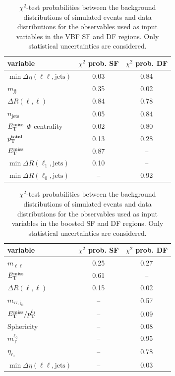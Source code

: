 \begin{table}
	\centering
    \caption{$\chi^2$-test probabilities between the background distributions of simulated events and data distributions for the observables
    used as input variables in the VBF SF and DF regions.
    Only statistical uncertainties are considered.}\label{tab:mva:modeling:sr:vbf}
	\begin{tabular}{lcc}
		\toprule
		variable & $\chi^2$ prob. SF & $\chi^2$ prob. DF \\ \midrule
		$\min \Delta \eta (\ell\ell, \text{jets})$  & 0.03 & 0.84 \\
		$m_\text{jj}$                               & 0.35 & 0.02 \\
		$\Delta R(\ell,\ell)$                       & 0.84 & 0.78 \\
		$n_\text{jets}$                             & 0.05 & 0.84 \\
		$E_\text{T}^\text{miss}$ $\Phi$ centrality                 & 0.02 & 0.80 \\
		$p_\text{T}^\text{total}$                          & 0.13 & 0.28 \\
		$E_\text{T}^\text{miss}$                                   & 0.87 & -- \\
		$\min \Delta R (\ell_1, \text{jets})$       & 0.10 & -- \\
		$\min \Delta R (\ell_0, \text{jets})$       & -- & 0.92 \\
		\bottomrule
	\end{tabular}
\end{table}

\begin{table}
	\centering
    \caption{$\chi^2$-test probabilities between the background distributions of simulated events and data distributions for the observables
    used as input variables in the boosted SF and DF regions.
    Only statistical uncertainties are considered.}\label{tab:mva:modeling:sr:boost}
	\begin{tabular}{lcc}
		\toprule
		variable & $\chi^2$ prob. SF & $\chi^2$ prob. DF \\ \midrule
		$m_{\ell\ell}$                              & 0.25 & 0.27 \\
		$E_\text{T}^\text{miss}$                                   & 0.61 & -- \\
		$\Delta R (\ell, \ell)$                     & 0.15 & 0.02 \\
		$m_{\tau\tau,\text{j}_0} $                  & -- & 0.57 \\
		$E_\text{T}^\text{miss} / p_\text{T}^{\ell_1}$                    & -- & 0.09 \\
		Sphericity                                  & -- & 0.08 \\
		$m_\text{T}^{\ell_0}$                       & -- & 0.95 \\
		$\eta_{\ell_0}$                             & -- & 0.78 \\
		$\min \Delta \eta (\ell\ell, \text{jets})$  & -- & 0.03 \\
		\bottomrule
	\end{tabular}
\end{table}


